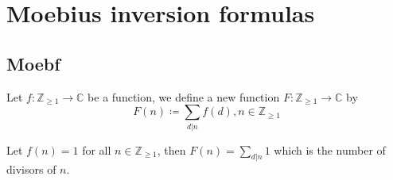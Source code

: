 \documentclass[../main.tex]{subfiles}
\begin{document}
\section{Moebius inversion formulas}
\subsection{Moebf}


Let $f: \mathbb{Z}_{\geq 1}  \to \mathbb{C}$ be a function, we define a new function $F: \mathbb{Z}_{\geq 1} \to \mathbb{C}$ by
\[ 
	F( n) \coloneqq \sum_{d|n} f( d) , n  \in   \mathbb{Z}_{\geq 1} 
\]
\begin{exemple}
	Let $f( n) =1$ for all $n \in \mathbb{Z}_{\geq 1} $, then $F( n) = \sum_{d|n} 1$ which is the number of divisors of $n$.
\end{exemple}
\end{document}
